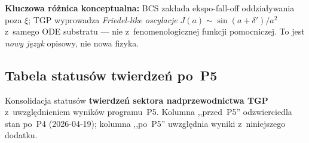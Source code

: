 \textbf{Kluczowa r\'o\.znica konceptualna:} BCS zak\l{}ada
ekspo-fall-off oddzia\l{}ywania poza $\xi$; TGP wyprowadza
\emph{Friedel-like oscylacje} $J(a) \sim \sin(a+\delta')/a^2$
z~samego ODE substratu --- nie z~fenomenologicznej funkcji
pomocniczej. To jest \emph{nowy j\k{e}zyk} opisowy, nie nowa fizyka.

\subsection{Tabela status\'ow twierdze\'n po~P5}%
\label{app:P5-status-table}

Konsolidacja status\'ow \textbf{twierdze\'n sektora nadprzewodnictwa TGP}
z~uwzgl\k{e}dnieniem wynik\'ow programu~P5. Kolumna ,,przed~P5''
odzwierciedla stan po~P4 (2026-04-19); kolumna ,,po~P5'' uwzgl\k{e}dnia
wyniki z~niniejszego dodatku.

